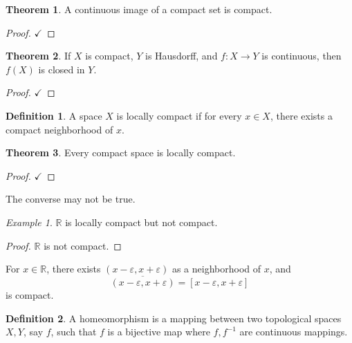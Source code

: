 \documentclass[11pt]{article}
\theoremstyle{definition}
\newtheorem{definition}{Definition}[section]
\newtheorem{theorem}{Theorem}[section]
\theoremstyle{remark}
\newtheorem{example}{Example}[section]
\begin{document}
\begin{theorem}\label{thm:continuous_image_compact}
A continuous image of a compact set is compact.
\end{theorem}

\begin{proof}
$\checkmark$
\end{proof}

\begin{theorem}\label{thm:compact_to_hausdorff_closed}
If $X$ is compact, $Y$ is Hausdorff, and $f\colon X\rightarrow Y$ is continuous, then $f(X)$ is closed in $Y$.
\end{theorem}

\begin{proof}
$\checkmark$
\end{proof}

\begin{definition}\label{def:locally_compact}
A space $X$ is locally compact if for every $x\in X$, there exists a compact neighborhood of $x$.
\end{definition}

\begin{theorem}\label{thm:compact_implies_locally_compact}
Every compact space is locally compact.
\end{theorem}

\begin{proof}
$\checkmark$
\end{proof}

The converse may not be true.

\begin{example}\label{ex:R_locally_compact_not_compact}
$\mathbb R$ is locally compact but not compact.
\end{example}

\begin{proof}
$\mathbb R$ is not compact.
\end{proof}

For $x\in\mathbb R$, there exists $(x-\varepsilon,x+\varepsilon)$ as a neighborhood of $x$, and
\[
\overline{(x-\varepsilon,x+\varepsilon)}=[x-\varepsilon,x+\varepsilon]
\]
is compact.

\begin{definition}\label{def:homeomorphism}
A homeomorphism is a mapping between two topological spaces $X,Y$, say $f$, such that $f$ is a bijective map where $f,f^{-1}$ are continuous mappings.
\end{definition}
\end{document}
